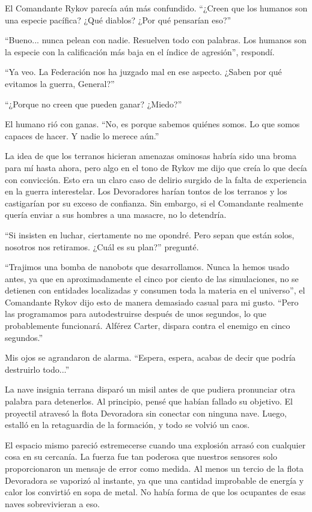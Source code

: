 El Comandante Rykov parecía aún más confundido. ``¿Creen que los humanos son una especie pacífica? ¿Qué diablos? ¿Por qué pensarían eso?''

``Bueno... nunca pelean con nadie. Resuelven todo con palabras. Los humanos son la especie con la calificación más baja en el índice de agresión'', respondí.

``Ya veo. La Federación nos ha juzgado mal en ese aspecto. ¿Saben por qué evitamos la guerra, General?''

``¿Porque no creen que pueden ganar? ¿Miedo?''

El humano rió con ganas. ``No, es porque sabemos quiénes somos. Lo que somos capaces de hacer. Y nadie lo merece aún.''

La idea de que los terranos hicieran amenazas ominosas habría sido una broma para mí hasta ahora, pero algo en el tono de Rykov me dijo que creía lo que decía con convicción. Esto era un claro caso de delirio surgido de la falta de experiencia en la guerra interestelar. Los Devoradores harían tontos de los terranos y los castigarían por su exceso de confianza. Sin embargo, si el Comandante realmente quería enviar a sus hombres a una masacre, no lo detendría.

``Si insisten en luchar, ciertamente no me opondré. Pero sepan que están solos, nosotros nos retiramos. ¿Cuál es su plan?'' pregunté.

``Trajimos una bomba de nanobots que desarrollamos. Nunca la hemos usado antes, ya que en aproximadamente el cinco por ciento de las simulaciones, no se detienen con entidades localizadas y consumen toda la materia en el universo'', el Comandante Rykov dijo esto de manera demasiado casual para mi gusto. ``Pero las programamos para autodestruirse después de unos segundos, lo que probablemente funcionará. Alférez Carter, dispara contra el enemigo en cinco segundos.''

Mis ojos se agrandaron de alarma. ``Espera, espera, acabas de decir que podría destruirlo todo...''

La nave insignia terrana disparó un misil antes de que pudiera pronunciar otra palabra para detenerlos. Al principio, pensé que habían fallado su objetivo. El proyectil atravesó la flota Devoradora sin conectar con ninguna nave. Luego, estalló en la retaguardia de la formación, y todo se volvió un caos.

El espacio mismo pareció estremecerse cuando una explosión arrasó con cualquier cosa en su cercanía. La fuerza fue tan poderosa que nuestros sensores solo proporcionaron un mensaje de error como medida. Al menos un tercio de la flota Devoradora se vaporizó al instante, ya que una cantidad improbable de energía y calor los convirtió en sopa de metal. No había forma de que los ocupantes de esas naves sobrevivieran a eso.

